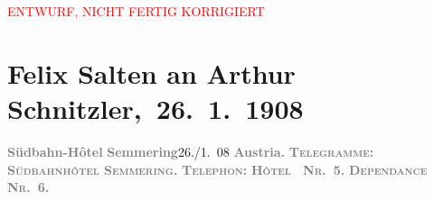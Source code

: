 
\begin{center}
            \textcolor{red}{ENTWURF, NICHT FERTIG KORRIGIERT}
                      \end{center}
            
         
         \renewcommand{\erwaehntePersonen}{Personen: Samuel Fischer, Hedwig Fischer, Margarethe Kainz, Josef Kainz, Anna Katharina Rehmann, Felix Salten, Ottilie Salten, Paul Salten, Paula Schlenther, Paul Schlenther, Olga Schnitzler, Heinrich Schnitzler,  W. Fred}
         \renewcommand{\erwaehnteInstitutionen}{Institutionen: Franz-Grillparzer-Preis}
         \renewcommand{\erwaehnteOrte}{Orte: Semmering, Südbahnhotel, Wien, Österreich}
         \renewcommand{\erwaehnteWerke}{Werke: Der Weg ins Freie. Roman, Die neue Rundschau, Tagebuch}
               \section[ Felix Salten an Arthur Schnitzler, 26. 1. 1908]{ Felix Salten an Arthur Schnitzler, 26. 1. 1908}\nopagebreak{}\rehead{ }\begin{ledgroupsized}[t]{13cm}\normalsize\beginnumbering \toendnotes[C]{\smallbreak\pagebreak[2]} 
\toendnotes[C]{\smallbreak}\pstart
           \noindent{}{\pb}\textcolor{gray}{\textbf{Südbahn-Hôtel}}\pend
           \pstart
           \textcolor{gray}{\textbf{Semmering}}\hfill 26./1. 08\pend
           \pstart
           \textcolor{gray}{\textbf{Austria.}}\pend
           \pstart
           \textcolor{gray}{\textbf{\textsc{\textbf{Telegramme:}}}}\pend
           \pstart
           \textcolor{gray}{\textbf{\textsc{\textbf{Südbahnhôtel Semmering.}}}}\pend
           \pstart
           \textcolor{gray}{\textbf{\textsc{Telephon:}}}\pend
           \pstart
           \textcolor{gray}{\textbf{\textsc{Hôtel {\dotsfour} Nr. 5.}}}\pend
           \pstart
           \textcolor{gray}{\textbf{\textsc{Dependance Nr. 6.}}}\pend

\end{ledgroupsized}
